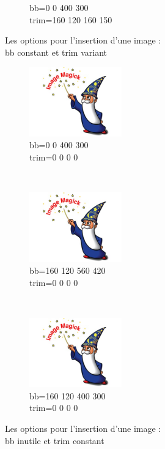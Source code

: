 \begin{figure}[h]
\begin{subfigure}[b]{0.3\textwidth}
        \caption{bb=0 0 400 300\\trim=160 120 160 150}
        \label{essai_9}
    \end{subfigure}
    \caption{Les options pour l'insertion d'une image :\\bb constant et trim variant}%
    \label{bb constant et trim variant}

\end{figure}


\begin{figure}[h]
    \centering
    \begin{subfigure}[b]{0.3\textwidth}
        \includegraphics[bb=0 0 400 300,trim=0 0 0 0,width=4cm,height=3cm,clip=true]{test.jpg}
        \caption{bb=0 0 400 300\\trim=0 0 0 0}
        \label{essai_a}
    \end{subfigure}
    ~
    \begin{subfigure}[b]{0.3\textwidth}
        \includegraphics[bb=160 120 560 420,trim=0 0 0 0,width=4cm,height=3cm,clip=true]{test.jpg}
        \caption{bb=160 120 560 420\\trim=0 0 0 0}
        \label{essai_2}
    \end{subfigure}
    ~
    \begin{subfigure}[b]{0.3\textwidth}
        \includegraphics[bb=160 120 400 300,trim=0 0 0 0,width=4cm,height=3cm,clip=true]{test.jpg}
        \caption{bb=160 120 400 300\\trim=0 0 0 0}
        \label{essai_3}
    \end{subfigure}
    \caption{Les options pour l'insertion d'une image :\\bb inutile et trim constant}%
    \label{bb inutile et trim constant}

\end{figure}


